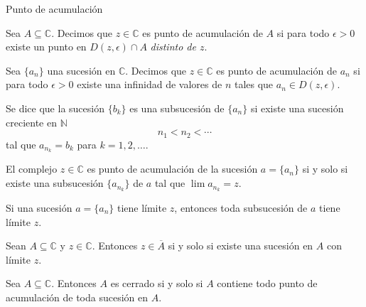 \documentclass[spanish,presentation]{beamer}
\begin{document}
\begin{frame}[label=sec-3-1]{Punto de acumulación}
\begin{definition}
Sea \(A\subseteq \mathbb{C}\). Decimos que \(z\in \mathbb{C}\) es
\alert{punto de acumulación} de \(A\) si para todo \(\epsilon>0\) existe
un punto en \(D(z,\epsilon)\cap A\) \emph{distinto de \(z\)}.
\end{definition}


\begin{definition}
Sea \(\{a_{n}\}\) una sucesión en \(\mathbb{C}\). Decimos que
\(z\in \mathbb{C}\) es \alert{punto de acumulación} de \(a_{n}\) si para
todo \(\epsilon>0\) existe una infinidad de valores de \(n\) tales
que \(a_{n}\in D(z,\epsilon)\).
\end{definition}
\end{frame}

\begin{frame}[label=sec-3-2]{}
\begin{definition}[Subsucesión]
Se dice que la sucesión \(\{b_{k}\}\) es una \alert{subsucesión} de
\(\{a_{n}\}\) si existe una sucesión creciente en \(\mathbb{N}\)
\begin{displaymath}
n_{1}<n_{2}<\cdots
\end{displaymath}
tal que \(a_{n_{k}}=b_{k}\) para \(k=1,2,\ldots\).
\end{definition}


\begin{theorem}
El complejo \(z\in \mathbb{C}\) es punto de acumulación de la
sucesión \(a=\{a_{n}\}\) si y solo si existe una subsucesión
\(\{a_{n_{k}}\}\) de \(a\) tal que \(\lim a_{n_{k}}=z\).
\end{theorem}
\end{frame}

\begin{frame}[label=sec-3-3]{}
\begin{theorem}
Si una sucesión \(a=\{a_{n}\}\) tiene límite \(z\), entonces toda
subsucesión de \(a\) tiene límite \(z\).
\end{theorem}

\begin{theorem}
Sean \(A\subseteq \mathbb{C}\) y \(z\in \mathbb{C}\). Entonces
\(z\in \overline{A}\) si y solo si existe una sucesión en \(A\)
con límite \(z\).
\end{theorem}

\begin{theorem}
Sea \(A\subseteq \mathbb{C}\). Entonces \(A\) es cerrado si y solo
si \(A\) contiene todo punto de acumulación de toda sucesión en
\(A\). 
\end{theorem}
\end{frame}
\end{document}
